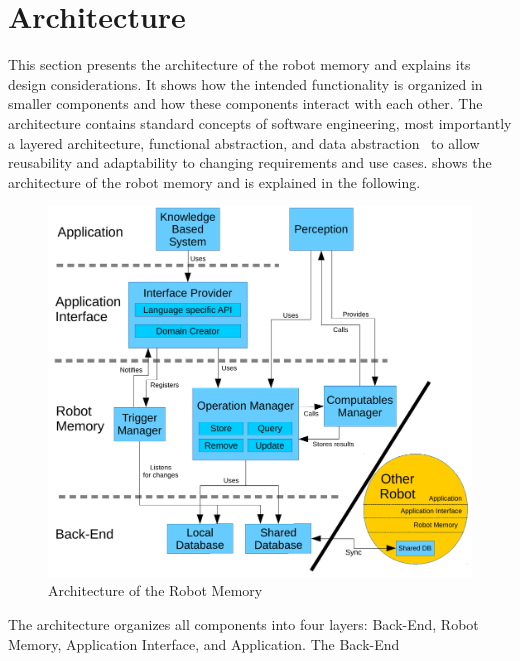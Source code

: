 {\section{Architecture}
\label{sec:architecture}
This section presents the architecture of the robot memory and
explains its design considerations. It shows how the intended
functionality is organized in smaller components and how these
components interact with each other. The architecture contains
standard concepts of software engineering, most importantly a layered
architecture, functional abstraction, and data
abstraction~\cite{software-architecture} to allow
reusability and adaptability to changing requirements and use cases.
 shows the architecture of the robot
memory and is explained in the following.
\begin{figure}
  \centering
  \includegraphics[width=\textwidth]{architecture.pdf}
  \vspace{-5mm}
  \caption[Architecture of the Robot Memory]{Architecture of the Robot Memory}
  \label{fig:arch}
  \vspace{-5mm}
\end{figure}
The architecture organizes all components into four layers: Back-End,
Robot Memory, Application Interface, and Application. The Back-End
}
